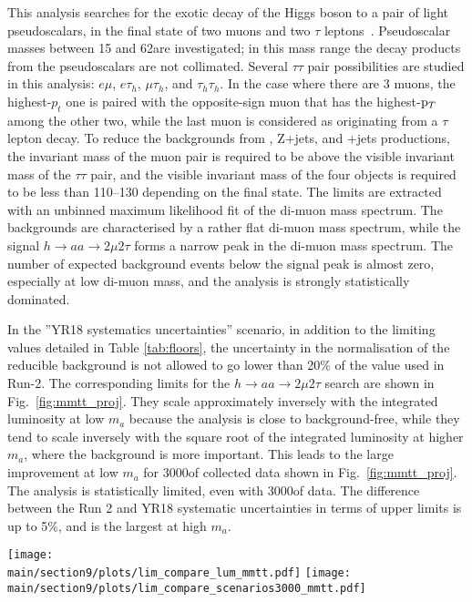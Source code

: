 This analysis searches for the exotic decay of the Higgs boson to a pair of light pseudoscalars, in the
final state of two muons and two $\tau$ leptons~\cite{Sirunyan:2018mbx}. Pseudoscalar
masses between 15 and 62\GeV are investigated; in this mass range the decay products from the pseudoscalars are
not collimated.
Several $\tau\tau$ pair possibilities are studied in this analysis: $e\mu$, $e\tau_h$,
$\mu\tau_h$, and $\tau_h\tau_h$. In the case where there are 3 muons, the highest-$p_t$ one is paired with
the opposite-sign muon that has the highest-$\mathrm{p}_{T}$ among the other two, while the last muon is considered as
originating from a $\tau$ lepton decay.
To reduce the backgrounds from \PZ\PZ, Z+jets, and \PW\PZ+jets productions, the invariant mass of the muon pair
is required to be above the visible invariant mass of the $\tau\tau$ pair, and the
visible invariant mass of the four objects is required to be less than 110--130 \UGeV depending on the final state.
The limits are extracted with an unbinned maximum likelihood fit of the di-muon mass spectrum.
The backgrounds are characterised by a rather flat di-muon mass spectrum, while the signal $h\to aa \to 2\mu2\tau$
forms a narrow peak in the di-muon mass spectrum.
The number of expected background events below the signal peak is almost zero,
especially at low di-muon mass, and the analysis is strongly statistically dominated.

In the ''YR18 systematics uncertainties'' scenario, in addition to the limiting values detailed in Table \ref{tab:floors}, the uncertainty in the normalisation of the reducible background is not allowed to go lower than 20\% of the value used in Run-2. The corresponding limits for the $h \to aa \to 2\mu2\tau$ search are shown in Fig.~\ref{fig:mmtt_proj}.
They scale approximately inversely with the integrated luminosity at low $m_a$ because the
analysis is close to background-free, while they tend to scale inversely with the square root of the integrated luminosity at higher $m_a$, where the background is more important. This leads to the large improvement at low $m_a$ for 3000\fbinv of collected data shown in Fig.~\ref{fig:mmtt_proj}. The analysis is statistically limited, even with 3000\fbinv of data. The difference between the Run 2 and YR18 systematic uncertainties in terms of upper limits
is up to 5\%, and is the largest at high $m_a$.

\begin{figure*}[hbpt]
\centering
        \texttt{[image: \\main/section9/plots/lim\_compare\_lum\_mmtt.pdf]}
        \texttt{[image: \\main/section9/plots/lim\_compare\_scenarios3000\_mmtt.pdf]}\\
    \caption{Left: Projected expected limits on $(\sigma(h)/\sigma_{\textrm{SM}}) \mathcal{B}(h \to aa \to 2\mu 2\tau)$, for 36, 300, and 3000 fb$^{-1}$. Right: Projected expected limits on $(\sigma(h)/\sigma_{\textrm{SM}}) \mathcal{B}(h\to aa \to 2\mu2\tau)$, comparing different scenarios for systematic uncertainties for an integrated luminosity of 3000\fbinv.}
    \label{fig:mmtt_proj}
\end{figure*}

